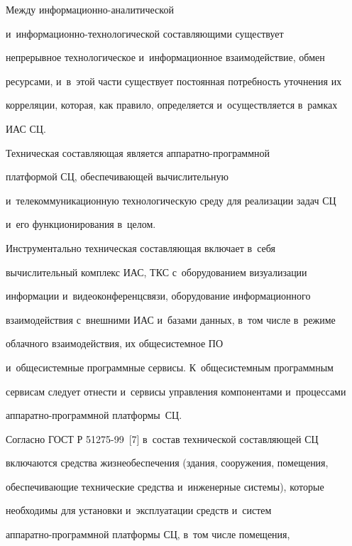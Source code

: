     

    Между информационно-аналитической  

и~ин\-фор\-ма\-ци\-он\-но-тех\-но\-ло\-ги\-че\-ской составляющими существует 

непрерывное технологическое и~информационное взаимодействие, обмен 

ресурсами, и~в~этой части существует постоянная потребность уточнения их 

корреляции, которая, как правило, определяется и~осуществляется в~рамках 

ИАС СЦ. 





    

    Техническая составляющая является ап\-па\-рат\-но-про\-граммной 

платформой СЦ, обеспечивающей вычислительную 

и~телекоммуникационную технологическую среду для реализации задач СЦ 

и~его функционирования в~целом.

    

    Инструментально техническая составляющая включает в~себя 

вычислительный комплекс ИАС, ТКС с~оборудованием визуализации 

информации и~видеоконференцсвязи, оборудование информационного 

взаимодействия с~внешними ИАС и~базами данных, в~том числе в~режиме 

облачного взаимодействия, их обще\-сис\-тем\-ное ПО

и~обще\-сис\-тем\-ные программные сервисы. К~общесистемным программным 

сервисам следует отнести и~сервисы управления компонентами и~процессами 

ап\-па\-рат\-но-про\-грам\-мной платформы~СЦ.

    

    Согласно ГОСТ Р 51275-99~[7] в~состав технической составляющей СЦ 

включаются средства жизнеобеспечения (здания, сооружения, помещения, 

обеспечивающие технические средства и~инженерные сис\-те\-мы), которые 

необходимы для установки и~эксплуатации средств и~сис\-тем  

ап\-па\-рат\-но-про\-граммной платформы СЦ, в~том числе помещения, 

